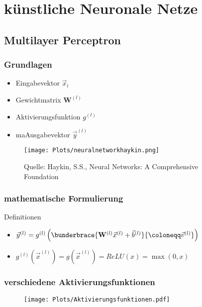 \section{künstliche Neuronale Netze}
\subsection{Multilayer Perceptron}

\begin{frame}
  \frametitle{Grundlagen}
  \begin{minipage}{0.5\textwidth}
   \begin{itemize}
     \item Eingabevektor $\vec{x}_l$
     \item Gewichtmatrix $\mathbf{W}^{\left( l \right)}$
     \item Aktivierungsfunktion $g^{\left( l \right)}$
     \item maAusgabevektor $\vec{y}^{(l)}$
   \end{itemize}
  \end{minipage}%
  \hfill%
  \begin{minipage}{0.5\textwidth}
    \begin{figure}
      \centering
      \texttt{[image: Plots/neuralnetworkhaykin.png]}
      \caption{Quelle: Haykin, S.S., Neural Networks: A Comprehensive Foundation}
    \end{figure}
  \end{minipage}
\end{frame}

\begin{frame}
  \frametitle{mathematische Formulierung}
  \begin{block}{Definitionen}
    \begin{itemize}
      \item $\vec{y}^{\left( l \right)} = g^{\left( l \right)}
              \left( \bunderbrace{ \mathbf{W}^{\left( l \right)}
              \vec{x}^{\left( l \right)} + \vec{b}^{\left( l \right)}}
              {\coloneqq \vec{v}^{\left(l\right)} }  \right)$
      \item $g^{(l)}(\vec{x}^{(l)}) = g(\vec{x}^{(l)}) = ReLU \left( x \right) = \max \left ( 0,x \right)$
    \end{itemize}
  \end{block}
\end{frame}


\begin{frame}
  \frametitle{verschiedene Aktivierungsfunktionen}
  \begin{figure}
    \centering
    \texttt{[image: Plots/Aktivierungsfunktionen.pdf]}
  \end{figure}
\end{frame}

